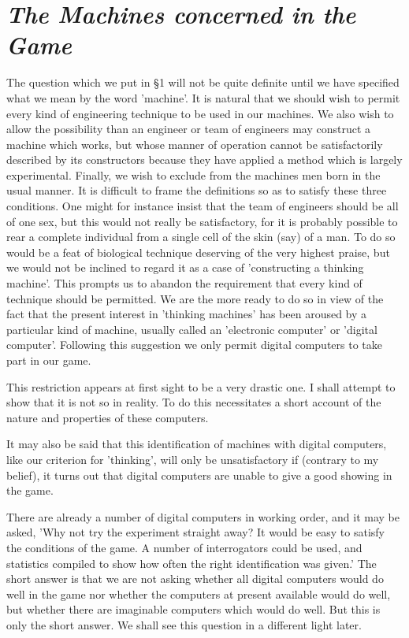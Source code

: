     \section{\textit{The Machines concerned in the Game}}
    
    The question which we put in \S 1 will not be quite definite until we have specified what we mean by the word 'machine'. It is natural that we should wish to permit every kind of engineering technique to be used in our machines. We also wish to allow the possibility than an engineer or team of engineers may construct a machine which works, but whose manner of operation cannot be satisfactorily described by its constructors because they have applied a method which is largely experimental. Finally, we wish to exclude from the machines men born in the usual manner. It is difficult to frame the definitions so as to satisfy these three conditions. One might for instance insist that the team of engineers should be all of one sex, but this would not really be satisfactory, for it is probably possible to rear a complete individual from a single cell of the skin (say) of a man. To do so would be a feat of biological technique deserving of the very highest praise, but we would not be inclined to regard it as a case of 'constructing a thinking machine'. This prompts us to abandon the requirement that every kind of technique should be permitted. We are the more ready to do so in view of the fact that the present interest in 'thinking machines' has been aroused by a particular kind of machine, usually called an 'electronic computer' or 'digital computer'. Following this suggestion we only permit digital computers to take part in our game.

    This restriction appears at first sight to be a very drastic one. I shall attempt to show that it is not so in reality. To do this necessitates a short account of the nature and properties of these computers.

    It may also be said that this identification of machines with digital computers, like our criterion for 'thinking', will only be unsatisfactory if (contrary to my belief), it turns out that digital computers are unable to give a good showing in the game.

    There are already a number of digital computers in working order, and it may be asked, 'Why not try the experiment straight away? It would be easy to satisfy the conditions of the game. A number of interrogators could be used, and statistics compiled to show how often the right identification was given.' The short answer is that we are not asking whether all digital computers would do well in the game nor whether the computers at present available would do well, but whether there are imaginable computers which would do well. But this is only the short answer. We shall see this question in a different light later.